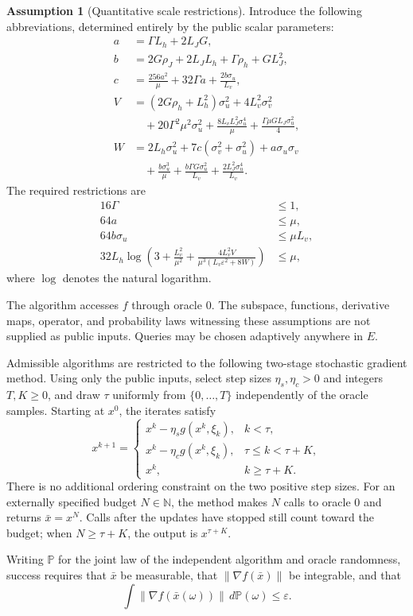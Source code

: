 \documentclass[10pt]{article}
\theoremstyle{definition}
\newtheorem{assumption}{Assumption}
\begin{document}
\begin{assumption}[Quantitative scale restrictions]
Introduce the following abbreviations, determined entirely by the public scalar parameters:
\[
\begin{aligned}
a&=\Gamma L_h+2L_JG,\\
b&=2G\rho_J+2L_JL_h+\Gamma\rho_h+GL_J^2,\\
c&=\frac{256a^2}{\mu}+32\Gamma a+\frac{2b\sigma_u}{L_v},\\
V&=(2G\rho_h+L_h^2)\sigma_u^2+4L_v^2\sigma_v^2\\
 &\quad+20\Gamma^2\mu^2\sigma_u^2
 +\frac{8L_vL_J^2\sigma_u^4}{\mu}
 +\frac{\Gamma\mu GL_J\sigma_u^2}{4},\\
W&=2L_h\sigma_u^2+7c(\sigma_v^2+\sigma_u^2)
 +a\sigma_u\sigma_v\\
 &\quad+\frac{b\sigma_u^3}{\mu}
 +\frac{b\Gamma G\sigma_u^2}{L_v}
 +\frac{2L_J^2\sigma_u^4}{L_v}.
\end{aligned}
\]
The required restrictions are
\[
\begin{aligned}
16\Gamma&\leq1,\\
64a&\leq\mu,\\
64b\sigma_u&\leq\mu L_v,\\
32L_h\log\left(3+\frac{L_v^2}{\mu^2}
 +\frac{4L_v^2V}{\mu^3(L_v\varepsilon^2+8W)}\right)&\leq\mu,
\end{aligned}
\]
where $\log$ denotes the natural logarithm.
\end{assumption}

The algorithm accesses $f$ through oracle $0$. The subspace, functions, derivative maps, operator, and probability laws witnessing these assumptions are not supplied as public inputs. Queries may be chosen adaptively anywhere in $E$.

Admissible algorithms are restricted to the following two-stage stochastic gradient method. Using only the public inputs, select step sizes $\eta_s,\eta_c>0$ and integers $T,K\geq0$, and draw $\tau$ uniformly from $\{0,\ldots,T\}$ independently of the oracle samples. Starting at $x^0$, the iterates satisfy
\[
 x^{k+1}=\begin{cases}
 x^k-\eta_s g(x^k,\xi_k),&k<\tau,\\
 x^k-\eta_c g(x^k,\xi_k),&\tau\leq k<\tau+K,\\
 x^k,&k\geq\tau+K.
 \end{cases}
\]
There is no additional ordering constraint on the two positive step sizes. For an externally specified budget $N\in\mathbb{N}$, the method makes $N$ calls to oracle $0$ and returns $\bar{x}=x^N$. Calls after the updates have stopped still count toward the budget; when $N\geq\tau+K$, the output is $x^{\tau+K}$.

Writing $\mathbb{P}$ for the joint law of the independent algorithm and oracle randomness, success requires that $\bar{x}$ be measurable, that $\|\nabla f(\bar{x})\|$ be integrable, and that
\[
\int \|\nabla f(\bar{x}(\omega))\|\,d\mathbb{P}(\omega)
\leq\varepsilon.
\]
\end{document}
